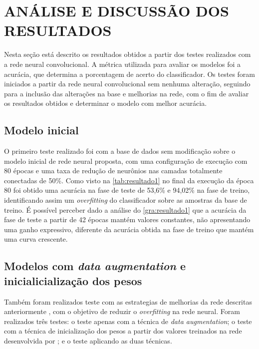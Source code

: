 
\chapter{ANÁLISE E DISCUSSÃO DOS RESULTADOS}


Nesta seção está descrito os resultados obtidos a partir dos testes realizados com a rede neural convolucional.
 A métrica utilizada para avaliar os modelos foi a acurácia, que determina a porcentagem de acerto do classificador.%
 Os testes foram iniciados a partir da rede neural convolucional sem nenhuma alteração, seguindo para a inclusão das alterações na base e melhorias na rede, com o fim de avaliar os resultados obtidos e determinar o modelo com melhor acurácia.

\section{Modelo inicial}
O primeiro teste realizado foi com a base de dados sem modificação sobre o modelo inicial de rede neural proposta, com uma configuração de execução com 80 épocas e uma taxa de redução de neurônios nas camadas totalmente conectadas de 50\%. Como visto na \autoref{tab:resultado1} no final da execução da época 80 foi obtido uma acurácia na fase de teste de 53,6\% e 94,02\% na fase de treino, identificando assim um \textit{overfitting} do classificador sobre as amostras da base de treino. É possível perceber dado a análise do \autoref{gra:resultado1} que a acurácia da fase de teste a partir de 42 épocas mantém valores constantes, não apresentando uma ganho expressivo, diferente da acurácia obtida na fase de treino que mantém uma curva crescente.
\section{Modelos com \textit{data augmentation} e inicialicialização dos pesos}
Também foram realizados teste com as estrategias de melhorias da rede descritas anteriormente 
, com o objetivo de reduzir o \textit{overfitting} na rede neural. Foram realizados três testes: o teste apenas com a técnica de \textit{data augmentation}; o teste com a técnica de inicialização dos pesos a partir dos valores treinados na rede desenvolvida por ; e o teste aplicando as duas técnicas. 

